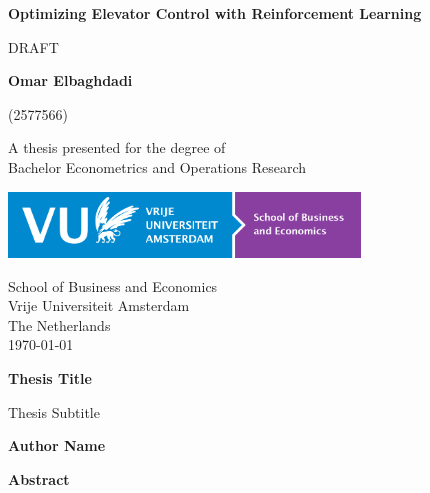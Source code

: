 \documentclass[11pt,a4paper]{article}
\theoremstyle{plain}
\theoremstyle{definition}
\begin{document}
\begin{titlepage}
    \begin{center}
        \vspace*{1cm}
        
        \Huge
        \textbf{Optimizing Elevator Control with Reinforcement Learning}
        
        \vspace{0.5cm}
        \LARGE
        DRAFT
        
        \vspace{1.5cm}
        
        \textbf{Omar Elbaghdadi}

        (2577566)
        
        \vfill
        
        A thesis presented for the degree of\\
        Bachelor Econometrics and Operations Research
        
        \vspace{0.8cm}
        
        \includegraphics[width=0.7\textwidth]{LogoSBE.png}

        \Large
        School of Business and Economics\\
        Vrije Universiteit Amsterdam\\
        The Netherlands\\
        \today
        
    \end{center}
\end{titlepage}



\thispagestyle{plain}
\begin{center}
    \Large
    \textbf{Thesis Title}
    
    \vspace{0.4cm}
    \large
    Thesis Subtitle
    
    \vspace{0.4cm}
    \textbf{Author Name}
    
    \vspace{0.9cm}
    \textbf{Abstract}
\end{center}
\blindtext
\newpage
\end{document}
